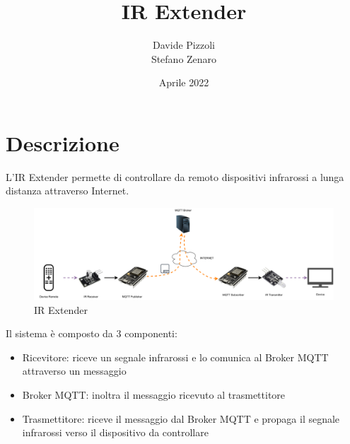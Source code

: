 \documentclass[a4paper,11pt]{article}
\begin{document}
\title{IR Extender}
\author{Davide Pizzoli \\ Stefano Zenaro}
\date{Aprile 2022}


\begin{titlepage}
  \maketitle
  \thispagestyle{empty}
\end{titlepage}

\tableofcontents
{}
\clearpage


\section{Descrizione}

    L'IR Extender permette di controllare da remoto dispositivi infrarossi a lunga distanza attraverso Internet.

    \begin{figure}[H]
      \centering
      \includegraphics[width=\textwidth,height=\textheight,keepaspectratio]{assets/ir_extender}
      \caption{IR Extender}
    \end{figure}

    Il sistema è composto da 3 componenti:
    \begin{itemize}
        \item Ricevitore: riceve un segnale infrarossi e lo comunica al Broker MQTT attraverso un messaggio
        \item Broker MQTT: inoltra il messaggio ricevuto al trasmettitore
        \item Trasmettitore: riceve il messaggio dal Broker MQTT e propaga il segnale infrarossi verso il dispositivo da controllare
    \end{itemize}

\end{document}

